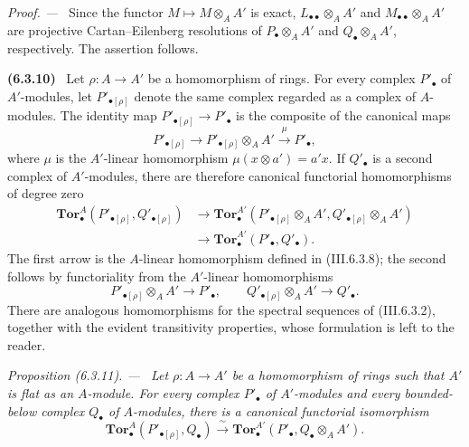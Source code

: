 \documentclass[10pt,oneside]{book}
\newcommand{\sref}[2][]{(#2)}
\newcommand{\oldpage}[2][]{\setcounter{footnote}{0}\marginpar{\scriptsize\textbf{#1}~|~#2}\ignorespaces}
\newenvironment{env}[1][]{\par\medskip\noindent\textbf{(#1)}\ }{\par}
\newenvironment{proposition}[1][]{\par\medskip\noindent\itshape Proposition (#1). ---\ }{\par}
\newenvironment{proof}{\par\medskip\noindent\textit{Proof. ---\ }}{\par}
\begin{document}
\begin{proof}
\oldpage[III]{145}
Since the functor $M\longmapsto M\otimes_AA'$ is exact,
$L_{\bullet\bullet}\otimes_AA'$ and
$M_{\bullet\bullet}\otimes_AA'$ are projective
Cartan--Eilenberg resolutions of $P_\bullet\otimes_AA'$ and
$Q_\bullet\otimes_AA'$, respectively.  The assertion follows.
\end{proof}

\begin{env}[6.3.10]
\label{III.6.3.10}
Let $\rho:A\longrightarrow A'$ be a homomorphism of rings.  For
every complex $P'_\bullet$ of $A'$-modules, let
$P'_{\bullet[\rho]}$ denote the same complex regarded as a complex
of $A$-modules.  The identity map
$P'_{\bullet[\rho]}\longrightarrow P'_\bullet$ is the composite of
the canonical maps
\[
  P'_{\bullet[\rho]}
  \longrightarrow
  P'_{\bullet[\rho]}\otimes_AA'
  \xrightarrow{\ \mu\ }P'_\bullet,
\]
where $\mu$ is the $A'$-linear homomorphism
$\mu(x\otimes a')=a'x$.  If $Q'_\bullet$ is a second complex of
$A'$-modules, there are therefore canonical functorial
homomorphisms of degree zero
\[
  \begin{split}
  \mathbf{Tor}_\bullet^A(P'_{\bullet[\rho]},Q'_{\bullet[\rho]})
  &\longrightarrow
  \mathbf{Tor}_\bullet^{A'}
  (P'_{\bullet[\rho]}\otimes_AA',
   Q'_{\bullet[\rho]}\otimes_AA')\\
  &\longrightarrow
  \mathbf{Tor}_\bullet^{A'}(P'_\bullet,Q'_\bullet).
  \end{split}
  \tag{6.3.10.1}\label{III.6.3.10.1}
\]
The first arrow is the $A$-linear homomorphism defined in
\sref{III.6.3.8}; the second follows by functoriality from the
$A'$-linear homomorphisms
\[
  P'_{\bullet[\rho]}\otimes_AA'\longrightarrow P'_\bullet,
  \qquad
  Q'_{\bullet[\rho]}\otimes_AA'\longrightarrow Q'_\bullet.
\]
There are analogous homomorphisms for the spectral sequences of
\sref{III.6.3.2}, together with the evident transitivity
properties, whose formulation is left to the reader.
\end{env}

\begin{proposition}[6.3.11]
\label{III.6.3.11}
Let $\rho:A\longrightarrow A'$ be a homomorphism of rings such that
$A'$ is flat as an $A$-module.  For every complex $P'_\bullet$ of
$A'$-modules and every bounded-below complex $Q_\bullet$ of
$A$-modules, there is a canonical functorial isomorphism
\[
  \mathbf{Tor}_\bullet^A(P'_{\bullet[\rho]},Q_\bullet)
  \xrightarrow{\ \sim\ }
  \mathbf{Tor}_\bullet^{A'}(P'_\bullet,Q_\bullet\otimes_AA').
  \tag{6.3.11.1}\label{III.6.3.11.1}
\]
\end{proposition}
\end{document}
